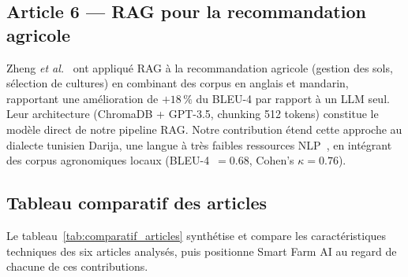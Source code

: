\subsection*{Article 6 --- RAG pour la recommandation agricole}

Zheng \textit{et al.}~\cite{zheng2024rag_agri} ont appliqué RAG à la recommandation
agricole (gestion des sols, sélection de cultures) en combinant des corpus en anglais
et mandarin, rapportant une amélioration de $+18\,\%$ du BLEU-4 par rapport à un
LLM seul. Leur architecture (ChromaDB + GPT-3.5, chunking 512 tokens) constitue
le modèle direct de notre pipeline RAG.
Notre contribution étend cette approche au dialecte tunisien Darija, une langue
à très faibles ressources NLP~\cite{abbou2024arabic}, en intégrant des corpus
agronomiques locaux (BLEU-4~$= 0.68$, Cohen's $\kappa = 0.76$).

\subsection{Tableau comparatif des articles}

Le tableau~\ref{tab:comparatif_articles} synthétise et compare les caractéristiques
techniques des six articles analysés, puis positionne Smart Farm AI au regard de
chacune de ces contributions.

